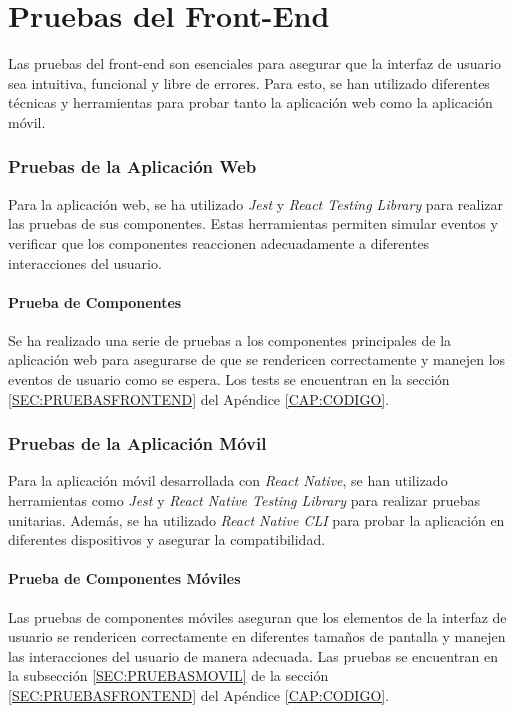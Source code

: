 \section{Pruebas del Front-End}

Las pruebas del front-end son esenciales para asegurar que la interfaz de usuario sea intuitiva, funcional y libre de errores. Para esto, se han utilizado diferentes técnicas y herramientas para probar tanto la aplicación web como la aplicación móvil.

\subsubsection{Pruebas de la Aplicación Web}
Para la aplicación web, se ha utilizado \textit{Jest} y \textit{React Testing Library} para realizar las pruebas de sus componentes. Estas herramientas permiten simular eventos y verificar que los componentes reaccionen adecuadamente a diferentes interacciones del usuario.

\paragraph{Prueba de Componentes}
Se ha realizado una serie de pruebas a los componentes principales de la aplicación web para asegurarse de que se rendericen correctamente y manejen los eventos de usuario como se espera.  Los tests se encuentran en la sección \ref{SEC:PRUEBASFRONTEND} del Apéndice \ref{CAP:CODIGO}.
\subsubsection{Pruebas de la Aplicación Móvil}
Para la aplicación móvil desarrollada con \textit{React Native}, se han utilizado herramientas como \textit{Jest} y \textit{React Native Testing Library} para realizar pruebas unitarias. Además, se ha utilizado \textit{React Native CLI} para probar la aplicación en diferentes dispositivos y asegurar la compatibilidad. 

\paragraph{Prueba de Componentes Móviles}
Las pruebas de componentes móviles aseguran que los elementos de la interfaz de usuario se rendericen correctamente en diferentes tamaños de pantalla y manejen las interacciones del usuario de manera adecuada. Las pruebas se encuentran en la subsección \ref{SEC:PRUEBASMOVIL} de la sección \ref{SEC:PRUEBASFRONTEND} del Apéndice \ref{CAP:CODIGO}.

